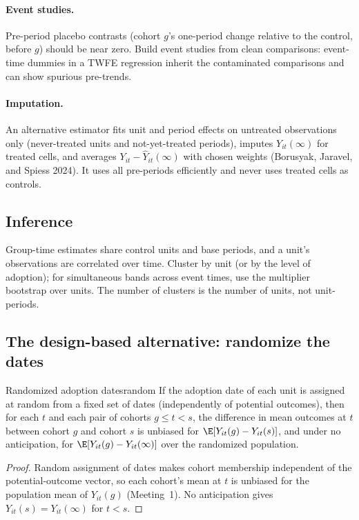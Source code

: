 \documentclass[11pt]{article}
\begin{document}
\paragraph{Event studies.} Pre-period placebo contrasts (cohort $g$'s one-period change relative to the control, before $g$) should be near zero. Build event
studies from clean comparisons: event-time dummies in a TWFE regression inherit the contaminated comparisons and can show spurious pre-trends.

\paragraph{Imputation.} An alternative estimator fits unit and period effects on untreated observations only (never-treated units and not-yet-treated periods),
imputes $Y_{it}(\infty)$ for treated cells, and averages $Y_{it} - \hat Y_{it}(\infty)$ with chosen weights (Borusyak, Jaravel, and Spiess 2024). It uses all
pre-periods efficiently and never uses treated cells as controls.

\subsection{Inference}

Group-time estimates share control units and base periods, and a unit's observations are correlated over time. Cluster by unit (or by the level of adoption);
for simultaneous bands across event times, use the multiplier bootstrap over units. The number of clusters is the number of units, not unit-periods.

\subsection{The design-based alternative: randomize the dates}

\begin{prop}{Randomized adoption dates}{random}
If the adoption date of each unit is assigned at random from a fixed set of dates (independently of potential outcomes), then for each $t$ and each pair of
cohorts $g \le t < s$, the difference in mean outcomes at $t$ between cohort $g$ and cohort $s$ is unbiased for $\E[Y_{it}(g) - Y_{it}(s)]$, and under no
anticipation, for $\E[Y_{it}(g) - Y_{it}(\infty)]$ over the randomized population.
\end{prop}
\begin{proof}
Random assignment of dates makes cohort membership independent of the potential-outcome vector, so each cohort's mean at $t$ is unbiased for the
population mean of $Y_{it}(g)$ (Meeting~1). No anticipation gives $Y_{it}(s) = Y_{it}(\infty)$ for $t < s$.
\end{proof}
\end{document}

